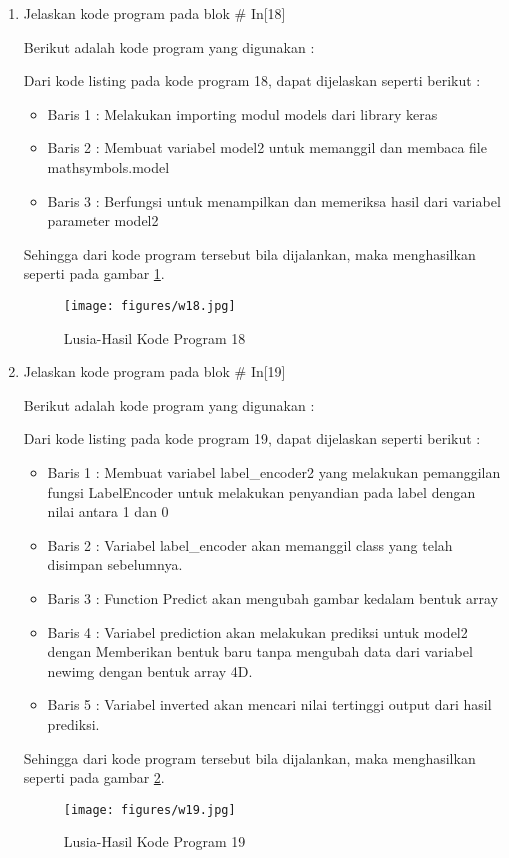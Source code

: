 \begin{enumerate}
\item Jelaskan kode program pada blok \# In[18]
	\par Berikut adalah kode program yang digunakan :
	
	\par Dari kode listing pada kode program 18, dapat dijelaskan seperti berikut :
	\begin{itemize}
	\item Baris 1	: Melakukan importing modul models dari library keras
	\item Baris 2	: Membuat variabel model2 untuk memanggil dan membaca file mathsymbols.model
	\item Baris 3	: Berfungsi untuk menampilkan dan memeriksa hasil dari variabel parameter model2
	\end{itemize}
	\par Sehingga dari kode program tersebut bila dijalankan, maka menghasilkan seperti pada gambar \ref{7B18}.
		\begin{figure}[!hbtp]
		\centering
		\texttt{[image: figures/w18.jpg]}
		\caption{Lusia-Hasil Kode Program 18}
		\label{7B18}
		\end{figure}

\item Jelaskan kode program pada blok \# In[19]
	\par Berikut adalah kode program yang digunakan :
	
	\par Dari kode listing pada kode program 19, dapat dijelaskan seperti berikut :
	\begin{itemize}
	\item Baris 1	: Membuat variabel label\_encoder2 yang melakukan pemanggilan fungsi LabelEncoder untuk melakukan penyandian pada label dengan nilai antara 1 dan 0
	\item Baris 2	: Variabel label\_encoder akan memanggil class yang telah disimpan sebelumnya.
	\item Baris 3	: Function Predict akan mengubah gambar kedalam bentuk array
	\item Baris 4	: Variabel prediction akan melakukan prediksi untuk model2 dengan Memberikan bentuk baru tanpa mengubah data dari variabel newimg dengan bentuk array 4D.
	\item Baris 5	: Variabel inverted akan mencari nilai tertinggi output dari hasil prediksi.
	\end{itemize}
	\par Sehingga dari kode program tersebut bila dijalankan, maka menghasilkan seperti pada gambar \ref{7B19}.
		\begin{figure}[!hbtp]
		\centering
		\texttt{[image: figures/w19.jpg]}
		\caption{Lusia-Hasil Kode Program 19}
		\label{7B19}
		\end{figure}
		

\end{enumerate}

